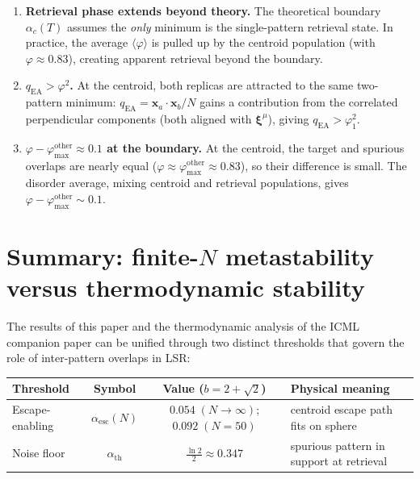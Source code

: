 \documentclass[11pt]{article}
\newcommand{\bxi}{\boldsymbol{\xi}}
\newcommand{\bx}{\mathbf{x}}
\newcommand{\avg}[1]{\langle #1 \rangle}
\begin{document}
\begin{enumerate}
\item \textbf{Retrieval phase extends beyond theory.}  The theoretical boundary $\alpha_c(T)$ assumes the \emph{only} minimum is the single-pattern retrieval state.  In practice, the average $\avg{\varphi}$ is pulled up by the centroid population (with $\varphi \approx 0.83$), creating apparent retrieval beyond the boundary.

\item \textbf{$q_{\mathrm{EA}} > \varphi^2$.}  At the centroid, both replicas are attracted to the same two-pattern minimum: $q_{\mathrm{EA}} = \bx_a \cdot \bx_b / N$ gains a contribution from the correlated perpendicular components (both aligned with $\bxi^\mu$), giving $q_{\mathrm{EA}} > \varphi_1^2$.

\item \textbf{$\varphi - \varphi_{\max}^{\mathrm{other}} \approx 0.1$ at the boundary.}  At the centroid, the target and spurious overlaps are nearly equal ($\varphi \approx \varphi_{\max}^{\mathrm{other}} \approx 0.83$), so their difference is small.  The disorder average, mixing centroid and retrieval populations, gives $\varphi - \varphi_{\max}^{\mathrm{other}} \sim 0.1$.
\end{enumerate}

\section{Summary: finite-$N$ metastability versus thermodynamic stability}
\label{sec:summary}

The results of this paper and the thermodynamic analysis of the ICML companion paper can be unified through two distinct thresholds that govern the role of inter-pattern overlaps in LSR:

\begin{center}
\begin{tabular}{lccl}
\toprule
Threshold & Symbol & Value ($b = 2\!+\!\sqrt{2}$) & Physical meaning \\
\midrule
Escape-enabling & $\alpha_{\mathrm{esc}}(N)$ & $0.054\;(N\!\to\!\infty)$;\; $0.092\;(N\!=\!50)$ & centroid escape path fits on sphere \\
Noise floor & $\alpha_{\mathrm{th}}$ & $\tfrac{\ln 2}{2} \approx 0.347$ & spurious pattern in support at retrieval \\
\bottomrule
\end{tabular}
\end{center}
\end{document}
